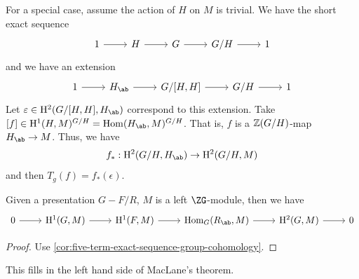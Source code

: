 \documentclass{article}
\begin{document}
For a special case, assume the action of \(H\) on \(M\) is trivial. We have the short exact sequence
\[\begin{tikzcd}
	1 & H & G & {G/H} & 1
	\arrow[from=1-1, to=1-2]
	\arrow[from=1-2, to=1-3]
	\arrow[from=1-3, to=1-4]
	\arrow[from=1-4, to=1-5]
\end{tikzcd}\]
and we have an extension
\[\begin{tikzcd}
	1 & {H_\ab} & {G/[H,H]} & {G/H} & 1
	\arrow[from=1-1, to=1-2]
	\arrow[from=1-2, to=1-3]
	\arrow[from=1-3, to=1-4]
	\arrow[from=1-4, to=1-5]
\end{tikzcd}\]
Let \(\epsilon \in \HH^2(G/[H, H], H_\ab)\) correspond to this extension. Take \([f] \in \HH^1(H, M)^{G/H} = \Hom(H_\ab, M)^{G/H}\). That is, \(f\) is a \(\mathbb{Z}(G/H)\)-map \(H_\ab \to M\). Thus, we have
\[f_* : \HH^2(G/H, H_\ab) \to \HH^2(G/H, M)\]
and then \(T_g(f) = f_*(\epsilon)\).

\begin{corollary}
    Given a presentation \(G - F/R\), \(M\) is a left \(\ZG\)-module, then we have
\[\begin{tikzcd}
	0 & {\HH^1(G,M)} & {\HH^1(F,M)} & {\Hom_G(R_\ab, M)} & {\HH^2(G,M)} & 0
	\arrow[from=1-1, to=1-2]
	\arrow[from=1-2, to=1-3]
	\arrow[from=1-3, to=1-4]
	\arrow[from=1-4, to=1-5]
	\arrow[from=1-5, to=1-6]
\end{tikzcd}\]
\end{corollary}

\begin{proof}
    Use \cref{cor:five-term-exact-sequence-group-cohomology}.
\end{proof}

This fills in the left hand side of MacLane's theorem.



\printindex
\end{document}
